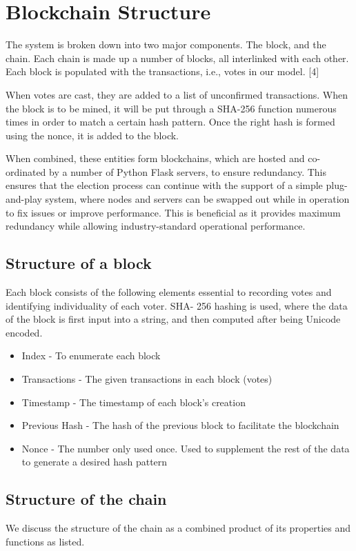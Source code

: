 \documentclass{article}
\begin{document}
    \section{Blockchain Structure}
    The system is broken down into two major components. The block, and the chain. Each chain is made up a number of blocks, all interlinked with each other. Each block is populated with the transactions, i.e., votes in our model. [4]

    When votes are cast, they are added to a list of unconfirmed transactions. When the block is to be mined, it will be put through a SHA-256 function numerous times in order to match a certain hash pattern. Once the right hash is formed using the nonce, it is added to the block.

    When combined, these entities form blockchains, which are hosted and co-ordinated by a number of Python Flask servers, to ensure redundancy. This ensures that the election process can continue with the support of a simple plug-and-play system, where nodes and servers can be swapped out while in operation to fix issues or improve performance. This is beneficial as it provides maximum redundancy while allowing industry-standard operational performance.
    \subsection{Structure of a block}
    Each block consists of the following elements essential to recording votes and identifying individuality of each voter. SHA- 256 hashing is used, where the data of the block is first input into a string, and then computed after being Unicode encoded.
    \begin{itemize}
        \item Index - To enumerate each block
        \item Transactions - The given transactions in each block (votes)
        \item Timestamp - The timestamp of each block's creation
        \item Previous Hash - The hash of the previous block to facilitate the blockchain
        \item Nonce - The number only used once. Used to supplement the rest of the data to generate a desired hash pattern
    \end{itemize}
    \subsection{Structure of the chain}
    We discuss the structure of the chain as a combined product of its properties and functions as listed.
\end{document}
